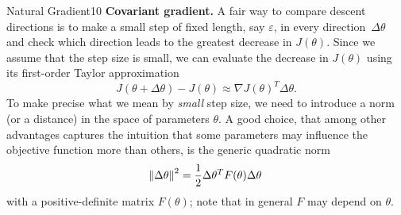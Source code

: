 \begin{questions}
\begin{question}[bonus]{Natural Gradient}{10}
\textbf{Covariant gradient.}
A fair way to compare descent directions is to make
a small step of fixed length, say $\varepsilon$,
in every direction~$\Delta \theta$ and check
which direction leads to the greatest decrease in $J(\theta)$.
Since we assume that the step size is small, we can evaluate
the decrease in $J(\theta)$ using its first-order Taylor approximation
\begin{equation*}
  J(\theta + \Delta \theta) - J(\theta) \approx
  \nabla J(\theta)^T \Delta \theta.
\end{equation*}
To make precise what we mean by \textit{small} step size,
we need to introduce a norm (or a distance)
in the space of parameters $\theta$.
A good choice, that among other advantages captures the intuition
that some parameters may influence the objective function more
than others,
is the generic quadratic norm
\begin{equation*}
  \norm{\Delta \theta}^2 =
  \frac{1}{2}\Delta \theta^T F(\theta) \Delta \theta
\end{equation*}
with a positive-definite matrix $F(\theta)$;
note that in general $F$ may depend on $\theta$.


\end{question}
\end{questions}
